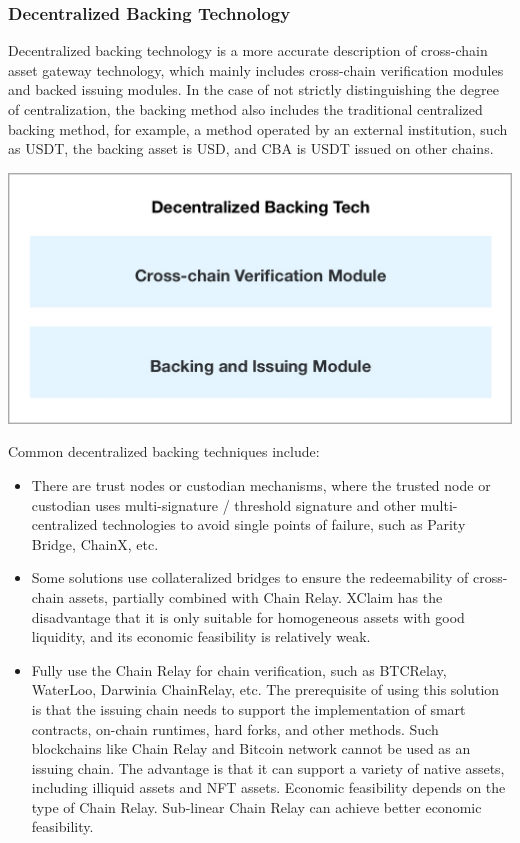 \subsubsection*{Decentralized Backing Technology}

Decentralized backing technology is a more accurate description of cross-chain asset gateway technology, which mainly includes cross-chain verification modules and backed issuing modules. In the case of not strictly distinguishing the degree of centralization, the backing method also includes the traditional centralized backing method, for example, a method operated by an external institution, such as USDT, the backing asset is USD, and CBA is USDT issued on other chains.

\includegraphics[scale=0.2]{pic/Decentralized Backing Technology.jpg}

Common decentralized backing techniques include:

\begin{itemize}
    \item There are trust nodes or custodian mechanisms, where the trusted node or custodian uses multi-signature / threshold signature and other multi-centralized technologies to avoid single points of failure, such as Parity Bridge, ChainX, etc.
    \item Some solutions use collateralized bridges to ensure the redeemability of cross-chain assets, partially combined with Chain Relay.  XClaim has the disadvantage that it is only suitable for homogeneous assets with good liquidity, and its economic feasibility is relatively weak.
    \item Fully use the Chain Relay for chain verification, such as BTCRelay, WaterLoo, Darwinia ChainRelay, etc. The prerequisite of using this solution is that the issuing chain needs to support the implementation of smart contracts, on-chain runtimes, hard forks, and other methods. Such blockchains like Chain Relay and  Bitcoin network cannot be used as an issuing chain. The advantage is that it can support a variety of native assets, including illiquid assets and NFT assets. Economic feasibility depends on the type of Chain Relay. Sub-linear Chain Relay can achieve better economic feasibility.

\end{itemize}

